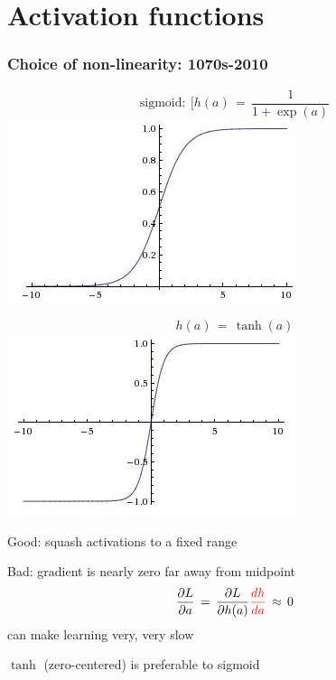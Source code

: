 \documentclass[xcolor=dvipsnames]{beamer}
\begin{document}
\section{Activation functions}
\begin{frame}
  \frametitle{Choice of non-linearity: 1070s-2010}
\begin{minipage}[c]{.5\linewidth}
\[\text{sigmoid}:\:[h(a)\,=\,\frac{1}{1+\exp(a)}
\]
\includegraphics[width=.7\textwidth]{ak-sigmoid}

\end{minipage}%
\begin{minipage}[c]{.5\linewidth}
\[h(a)\,=\,\tanh(a)
\]
\includegraphics[width=.7\textwidth]{ak-tanh}

\end{minipage}

\bi
\item Good: squash activations to a fixed range
\item Bad: gradient is nearly zero far away from midpoint
\[\frac{\partial L}{\partial a}\,=\,\frac{\partial L}{\partial h(a)}
\textcolor{red}{\frac{d h}{d a}}\,\approx\,0
\]
can make learning very, very slow
\item $\tanh$ (zero-centered) is preferable to sigmoid 
\ei
\end{frame}
\end{document}
